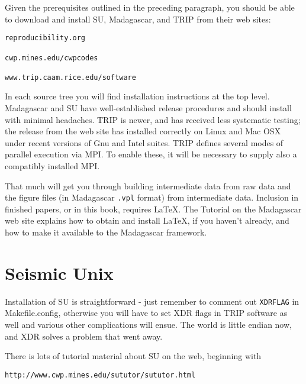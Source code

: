 Given the prerequisites outlined in the preceding paragraph, you should be able to download and install SU, Madagascar, and TRIP from their web sites:
\begin{verbatim}
reproducibility.org

cwp.mines.edu/cwpcodes

www.trip.caam.rice.edu/software
\end{verbatim}
In each source tree you will find installation instructions at the top level. Madagascar and SU have well-established release procedures and should install with minimal headaches. TRIP is newer, and has received less systematic testing; the release from the web site has installed correctly on Linux and Mac OSX under recent versions of Gnu and Intel suites. TRIP defines several modes of parallel execution via MPI. To enable these, it will be necessary to supply also a compatibly installed MPI.

That much will get you through building intermediate data from raw data and the figure files (in Madagascar {\tt .vpl} format) from intermediate data. Inclusion in finished papers, or in this book, requires \LaTeX. The Tutorial on the Madagascar web site explains how to obtain and install \LaTeX, if you haven't already, and how to make it available to the Madagascar framework.

\section{Seismic Unix}
Installation of SU is straightforward - just remember to comment out {\tt XDRFLAG} in Makefile.config, otherwise you will have to set XDR flags in TRIP software as well and various other complications will ensue. The world is little endian now, and XDR solves a problem that went away.

There is lots of tutorial material about SU on the web, beginning with
\begin{verbatim}
http://www.cwp.mines.edu/sututor/sututor.html
\end{verbatim}

